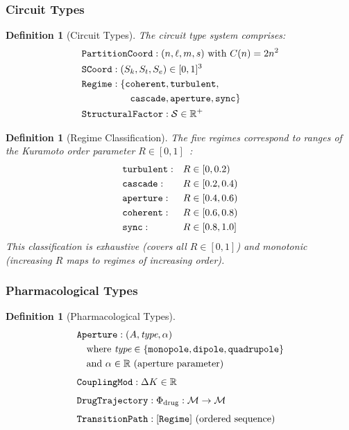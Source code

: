 \documentclass[10pt,twocolumn]{article}
\newtheorem{definition}[theorem]{Definition}
\theoremstyle{remark}
\newcommand{\Sk}{S_k}
\newcommand{\St}{S_t}
\newcommand{\Se}{S_e}
\newcommand{\Mstate}{\mathcal{M}}
\begin{document}
\subsubsection{Circuit Types}

\begin{definition}[Circuit Types]
\label{def:circuit_types}
The circuit type system comprises:
\begin{align}
&\texttt{PartitionCoord} : (n, \ell, m, s) \text{ with } C(n) = 2n^2 \label{eq:type_pc} \\
&\texttt{SCoord} : (\Sk, \St, \Se) \in [0,1]^3 \label{eq:type_sc} \\
&\texttt{Regime} : \{\texttt{coherent}, \texttt{turbulent}, \notag \\
&\qquad\qquad\quad \texttt{cascade}, \texttt{aperture}, \texttt{sync}\} \label{eq:type_regime} \\
&\texttt{StructuralFactor} : \mathcal{S} \in \mathbb{R}^+ \label{eq:type_sf}
\end{align}
\end{definition}

\begin{definition}[Regime Classification]
\label{def:regime_class}
The five regimes correspond to ranges of the Kuramoto order parameter $R \in [0,1]$~\cite{kuramoto1984chemical,strogatz2000kuramoto}:
\begin{align}
&\texttt{turbulent}: && R \in [0, 0.2) \notag \\
&\texttt{cascade}: && R \in [0.2, 0.4) \notag \\
&\texttt{aperture}: && R \in [0.4, 0.6) \notag \\
&\texttt{coherent}: && R \in [0.6, 0.8) \notag \\
&\texttt{sync}: && R \in [0.8, 1.0] \notag
\end{align}
This classification is exhaustive (covers all $R \in [0,1]$) and monotonic (increasing $R$ maps to regimes of increasing order).
\end{definition}

\subsubsection{Pharmacological Types}

\begin{definition}[Pharmacological Types]
\label{def:pharm_types}
\begin{align}
&\texttt{Aperture} : (A, \textit{type}, \alpha) \notag \\
&\quad \text{where } \textit{type} \in \{\texttt{monopole}, \texttt{dipole}, \texttt{quadrupole}\} \notag \\
&\quad \text{and } \alpha \in \mathbb{R} \text{ (aperture parameter)} \label{eq:type_ap} \\[4pt]
&\texttt{CouplingMod} : \Delta K \in \mathbb{R} \label{eq:type_cm} \\[4pt]
&\texttt{DrugTrajectory} : \Phi_{\mathrm{drug}} : \Mstate \to \Mstate \label{eq:type_dt} \\[4pt]
&\texttt{TransitionPath} : [\texttt{Regime}] \text{ (ordered sequence)} \label{eq:type_tp}
\end{align}
\end{definition}
\end{document}
